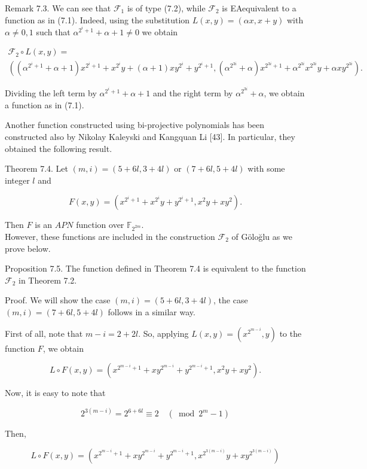 \documentclass[10pt]{article}
\begin{document}
Remark 7.3. We can see that $\mathcal{F}_{1}$ is of type (7.2), while $\mathcal{F}_{2}$ is EAequivalent to a function as in (7.1). Indeed, using the substitution $L(x, y)= (\alpha x, x+y)$ with $\alpha \neq 0,1$ such that $\alpha^{2^{i}+1}+\alpha+1 \neq 0$ we obtain

$$
\begin{gathered}
\mathcal{F}_{2} \circ L(x, y)= \\
\left(\left(\alpha^{2^{i}+1}+\alpha+1\right) x^{2^{i}+1}+x^{2^{i}} y+(\alpha+1) x y^{2^{i}}+y^{2^{i}+1},\left(\alpha^{2^{3 i}}+\alpha\right) x^{2^{3 i}+1}+\alpha^{2^{3 i}} x^{2^{3 i}} y+\alpha x y^{2^{3 i}}\right) .
\end{gathered}
$$

Dividing the left term by $\alpha^{2^{i}+1}+\alpha+1$ and the right term by $\alpha^{2^{3 i}}+\alpha$, we obtain a function as in (7.1).

Another function constructed using bi-projective polynomials has been constructed also by Nikolay Kaleyski and Kangquan Li [43]. In particular, they obtained the following result.

Theorem 7.4. Let $(m, i)=(5+6 l, 3+4 l)$ or $(7+6 l, 5+4 l)$ with some integer $l$ and

$$
F(x, y)=\left(x^{2^{i}+1}+x^{2^{i}} y+y^{2^{i}+1}, x^{2} y+x y^{2}\right) .
$$

Then $F$ is an $A P N$ function over $\mathbb{F}_{2^{2 m}}$.\\
However, these functions are included in the construction $\mathcal{F}_{2}$ of Göloğlu as we prove below.

Proposition 7.5. The function defined in Theorem 7.4 is equivalent to the function $\mathcal{F}_{2}$ in Theorem 7.2.

Proof. We will show the case $(m, i)=(5+6 l, 3+4 l)$, the case $(m, i)= (7+6 l, 5+4 l)$ follows in a similar way.

First of all, note that $m-i=2+2 l$. So, applying $L(x, y)=\left(x^{2^{m-i}}, y\right)$ to the function $F$, we obtain

$$
L \circ F(x, y)=\left(x^{2^{m-i}+1}+x y^{2^{m-i}}+y^{2^{m-i}+1}, x^{2} y+x y^{2}\right) .
$$

Now, it is easy to note that

$$
2^{3(m-i)}=2^{6+6 l} \equiv 2 \quad\left(\bmod 2^{m}-1\right)
$$

Then,

$$
L \circ F(x, y)=\left(x^{2^{m-i}+1}+x y^{2^{m-i}}+y^{2^{m-i}+1}, x^{2^{3(m-i)}} y+x y^{2^{3(m-i)}}\right)
$$
\end{document}
